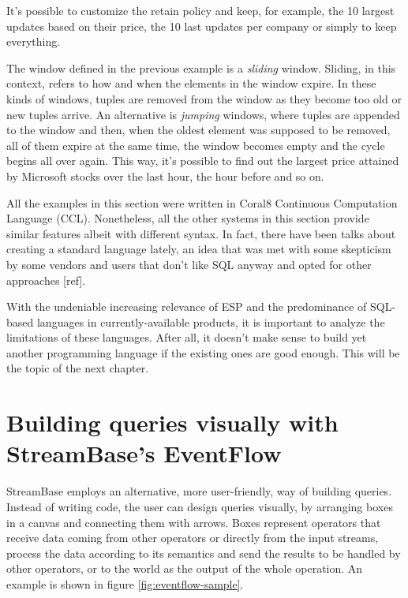 \documentclass{report}
\begin{document}
It's possible to customize the retain policy and keep, for example,
the 10 largest updates based on their price, the 10 last updates per
company or simply to keep everything.

The window defined in the previous example is a \emph{sliding}
window. Sliding, in this context, refers to how and when the elements
in the window expire. In these kinds of windows, tuples are removed
from the window as they become too old or new tuples arrive. An
alternative is \emph{jumping} windows, where tuples are appended to
the window and then, when the oldest element was supposed to be
removed, all of them expire at the same time, the window becomes empty
and the cycle begins all over again. This way, it's possible to find
out the largest price attained by Microsoft stocks over the last hour,
the hour before and so on.

All the examples in this section were written in Coral8 Continuous
Computation Language (CCL). Nonetheless, all the other systems in this
section provide similar features albeit with different syntax. In
fact, there have been talks about creating a standard language lately,
an idea that was met with some skepticism by some vendors and users
that don't like SQL anyway and opted for other approaches [ref].

With the undeniable increasing relevance of ESP and the predominance
of SQL-based languages in currently-available products, it is
important to analyze the limitations of these languages. After all, it
doesn't make sense to build yet another programming language if the
existing ones are good enough. This will be the topic of the next
chapter.

\section{Building queries visually with StreamBase's EventFlow}
\label{sec:eventflow}

StreamBase employs an alternative, more user-friendly, way of building
queries. Instead of writing code, the user can design queries
visually, by arranging boxes in a canvas and connecting them with
arrows. Boxes represent operators that receive data coming from other
operators or directly from the input streams, process the data
according to its semantics and send the results to be handled by other
operators, or to the world as the output of the whole operation. An
example is shown in figure \ref{fig:eventflow-sample}.
\end{document}
